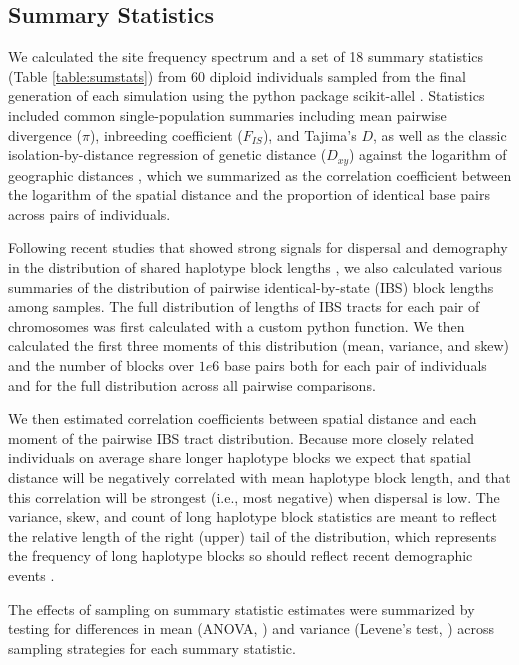 \documentclass[11pt,twoside,lineno]{preprint}
\begin{document}
\subsection{Summary Statistics}
We calculated the site frequency spectrum and a set of 18 summary statistics (Table \ref{table:sumstats}) from 60 diploid individuals sampled from the final generation of each simulation using the python package scikit-allel \citep{Miles2017}. 
Statistics included common single-population summaries including mean pairwise divergence ($\pi$), inbreeding coefficient ($F_{IS}$), and Tajima's $D$, 
as well as the classic isolation-by-distance regression of genetic distance ($D_{xy}$) against the logarithm of geographic distances \citep{Rousset1997}, 
which we summarized as the correlation coefficient between the logarithm of the spatial distance and the proportion of identical base pairs across pairs of individuals. 

Following recent studies that showed strong signals for dispersal and demography in the distribution of shared haplotype block lengths \citep{Ringbauer2017,Baharian2016}, we also calculated various summaries of the distribution of pairwise identical-by-state (IBS) block lengths among samples. The full distribution of lengths of IBS tracts for each pair of chromosomes was first calculated with a custom python function. 
We then calculated the first three moments of this distribution (mean, variance, and skew) and the number of blocks over $1e6$ base pairs both for each pair of individuals and for the full distribution across all pairwise comparisons. 

We then estimated correlation coefficients between spatial distance and each moment of the pairwise IBS tract distribution. Because more closely related individuals on average share longer haplotype blocks we expect that spatial distance will be negatively correlated with mean haplotype block length, and that this correlation will be strongest (i.e., most negative) when dispersal is low. The variance, skew, and count of long haplotype block statistics are meant to reflect the relative length of the right (upper) tail of the distribution, which represents the frequency of long haplotype blocks so should reflect recent demographic events \citep{chapman2002effect}. 

The effects of sampling on summary statistic estimates were summarized by testing for differences in mean (ANOVA, \citep{Rcore2018}) and variance (Levene's test, \citep{Fox2011}) across sampling strategies for each summary statistic. 
\end{document}
